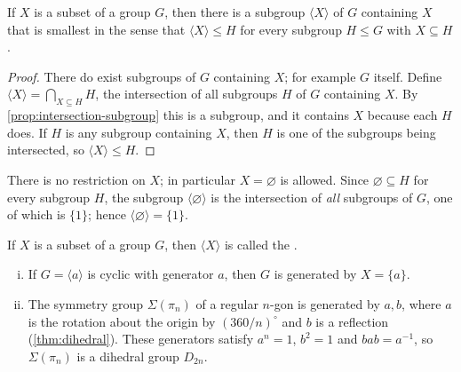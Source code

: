 \begin{corollary}\label{cor:generated-subgroup}
	If \(X\) is a subset of a group \(G\), then there is a subgroup \(\langle X\rangle\) of
	\(G\) containing \(X\) that is smallest in the sense that
	\(\langle X\rangle \leq H\) for every subgroup \(H \leq G\) with \(X \subseteq H\).
\end{corollary}

\begin{proof}
	There do exist subgroups of \(G\) containing \(X\); for example \(G\) itself. Define
	\(\langle X\rangle = \bigcap_{X \subseteq H} H\), the intersection of all subgroups
	\(H\) of \(G\) containing \(X\). By \autoref{prop:intersection-subgroup} this is
	a subgroup, and it contains \(X\) because each \(H\) does. If \(H\) is any subgroup
	containing \(X\), then \(H\) is one of the subgroups being intersected, so
	\(\langle X\rangle \leq H\).
\end{proof}

\begin{note}
	There is no restriction on \(X\); in particular \(X = \varnothing\) is allowed. Since
	\(\varnothing \subseteq H\) for every subgroup \(H\), the subgroup
	\(\langle\varnothing\rangle\) is the intersection of \emph{all} subgroups of \(G\), one
	of which is \(\{1\}\); hence \(\langle\varnothing\rangle = \{1\}\).
\end{note}

\begin{definition}
	If \(X\) is a subset of a group \(G\), then \(\langle X\rangle\) is called the
	.
\end{definition}

\begin{eg}
	\begin{enumerate}[(i)]
		\item If \(G = \langle a\rangle\) is cyclic with generator \(a\), then \(G\) is
		      generated by \(X = \{a\}\).
		\item The symmetry group \(\Sigma(\pi_n)\) of a regular \(n\)-gon is generated by
		      \(a, b\), where \(a\) is the rotation about the origin by \((360/n)^\circ\)
		      and \(b\) is a reflection (\autoref{thm:dihedral}). These generators
		      satisfy \(a^n = 1\), \(b^2 = 1\) and \(bab = a^{-1}\), so
		      \(\Sigma(\pi_n)\) is a dihedral group \(D_{2n}\).
	\end{enumerate}
\end{eg}

